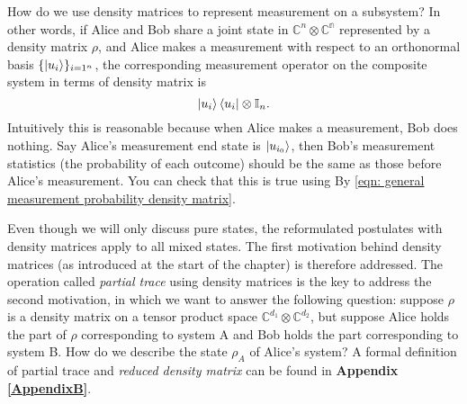 {\color{green}
How do we use density matrices to represent measurement on a subsystem? In other words, if Alice and Bob share a joint state in $\mathbb{C}^n \otimes \mathbb{C^n}$ represented by a density matrix $\rho$, and Alice makes a measurement with respect to an orthonormal basis $\{\ket{u_i}\}_{i=1^n}$, the corresponding measurement operator on the composite system in terms of density matrix is $$\ket{u_i}\bra{u_i} \otimes \mathbb{I}_n.$$ Intuitively this is reasonable because when Alice makes a measurement, Bob does nothing. Say Alice's measurement end state is $\ket{u_{i_0}}$, then Bob's measurement statistics (the probability of each outcome) should be the same as those before Alice's measurement. You can check that this is true using By \eqref{eqn: general measurement probability density matrix}.

Even though we will only discuss pure states, the reformulated postulates with density matrices apply to all mixed states. The first motivation behind density matrices (as introduced at the start of the chapter) is therefore addressed. The operation called \textit{partial trace} using density matrices is the key to address the second motivation, in which we want to answer the following question: suppose $\rho$ is a density matrix on a tensor product space $\mathbb{C}^{d_1} \otimes \mathbb{C}^{d_2}$, but suppose Alice holds the part of $\rho$ corresponding to system A and Bob holds the part corresponding to system B. How do we describe the state $\rho_A$ of Alice's system? A formal definition of partial trace and \textit{reduced density matrix} can be found in \textbf{Appendix \ref{AppendixB}}.
}



